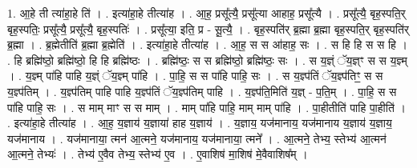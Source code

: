 \documentclass[17pt]{extarticle}
\begin{document}
1. आ॒हे ती त्या॑हा॒हे ति॑ । . इत्या॑हा॒हे तीत्या॑ह । . आ॒ह॒ प्रसू᳚त्यै॒ प्रसू᳚त्या आहाह॒ प्रसू᳚त्यै । . प्रसू᳚त्यै॒ बृह॒स्पति॒र् बृह॒स्पतिः॒ प्रसू᳚त्यै॒ प्रसू᳚त्यै॒ बृह॒स्पतिः॑ । . प्रसू᳚त्या॒ इति॒ प्र - सू॒त्यै॒ । . बृह॒स्पति॑र् ब्र॒ह्मा ब्र॒ह्मा बृह॒स्पति॒र् बृह॒स्पति॑र् ब्र॒ह्मा । . ब्र॒ह्मेतीति॑ ब्र॒ह्मा ब्र॒ह्मेति॑ । . इत्या॑हा॒हे तीत्या॑ह । . आ॒ह॒ स स आ॑हाह॒ सः । . स हि हि स स हि । . हि ब्रह्मि॑ष्ठो॒ ब्रह्मि॑ष्ठो॒ हि हि ब्रह्मि॑ष्ठः । . ब्रह्मि॑ष्ठः॒ स स ब्रह्मि॑ष्ठो॒ ब्रह्मि॑ष्ठः॒ सः । . स य॒ज्ञ्ं ॅय॒ज्ञ्ꣳ स स य॒ज्ञ्म् । . य॒ज्ञ्म् पा॑हि पाहि य॒ज्ञ्ं ॅय॒ज्ञ्म् पा॑हि । . पा॒हि॒ स स पा॑हि पाहि॒ सः । . स य॒ज्ञ्प॑तिं ॅय॒ज्ञ्प॑तिꣳ॒॒ स स य॒ज्ञ्प॑तिम् । . य॒ज्ञ्प॑तिम् पाहि पाहि य॒ज्ञ्प॑तिं ॅय॒ज्ञ्प॑तिम् पाहि । . य॒ज्ञ्प॑ति॒मिति॑ य॒ज्ञ् - प॒ति॒म् । . पा॒हि॒ स स पा॑हि पाहि॒ सः । . स माम् माꣳ स स माम् । . माम् पा॑हि पाहि॒ माम् माम् पा॑हि । . पा॒हीतीति॑ पाहि पा॒हीति॑ । . इत्या॑हा॒हे तीत्या॑ह । . आ॒ह॒ य॒ज्ञाय॑ य॒ज्ञाया॑ हाह य॒ज्ञाय॑ । . य॒ज्ञाय॒ यज॑मानाय॒ यज॑मानाय य॒ज्ञाय॑ य॒ज्ञाय॒ यज॑मानाय । . यज॑मानाया॒ त्मन॑ आ॒त्मने॒ यज॑मानाय॒ यज॑मानाया॒ त्मने᳚ । . आ॒त्मने॒ तेभ्य॒ स्तेभ्य॑ आ॒त्मन॑ आ॒त्मने॒ तेभ्यः॑ । . तेभ्य॑ ए॒वैव तेभ्य॒ स्तेभ्य॑ ए॒व । . ए॒वाशिष॑ मा॒शिष॑ मे॒वैवाशिष᳚म् । \newline
\end{document}
